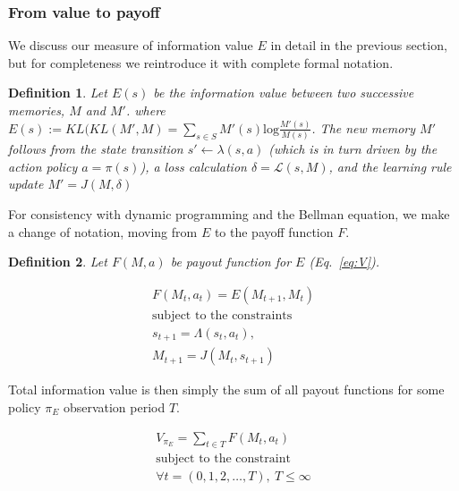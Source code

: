 \documentclass[9pt,twocolumn,twoside]{pnas-new}
\newtheorem{definition}{Definition}
\begin{document}
\subsubsection*{From value to payoff}
We discuss our measure of information value $E$ in detail in the previous section, but for completeness we reintroduce it with complete formal notation.

\begin{definition}
    Let $E(s)$ be the information value between two successive memories, $M$ and $M'$. where $E(s) := KL(KL(M', M) = \sum_{s \in S} M'(s) \text{log} \frac{M'(s)}{M(s)} $. The new memory $M'$ follows from the state transition $s' \leftarrow \lambda (s, a)$ (which is in turn driven by the action policy $a = \pi(s)$), a loss calculation $\delta = \mathcal{L}(s, M)$, and the learning rule update $M' = J(M, \delta)$
\end{definition}

For consistency with dynamic programming and the Bellman equation, we make a change of notation, moving from $E$ to the payoff function $F$.

\begin{definition}
    Let $F(M, a)$ be payout function for $E$ (Eq.~\ref{eq:V}).
\end{definition}

\begin{equation}
    \begin{split} \label{eq:V}
    F(M_t, a_t) = E(M_{t+1}, M_{t})\\
    \text{subject to the constraints} \\
    s_{t+1} = \Lambda(s_t, a_t),\\ 
    M_{t+1} = J(M_t, s_{t+1})
    \end{split} 
\end{equation}

Total information value is then simply the sum of all payout functions for some policy $\pi_E$ observation period $T$. 

\begin{equation} \label{eq:V}
    \begin{split}
        V_{\pi_E} = \sum_{t \in T} F(M_t, a_t)\\
        \text{subject to the constraint}\\
        \forall t = (0,1,2,\ldots, T),\ T \leq \infty
    \end{split}
\end{equation}

\end{document}
